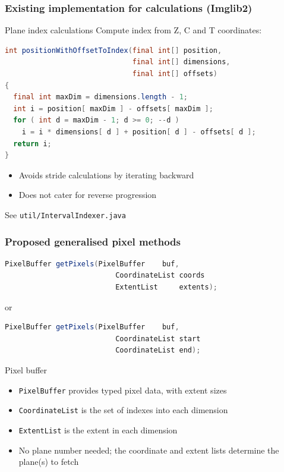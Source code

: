 \documentclass{beamer}
\newcommand{\filename}[1]{\texttt{#1}}
\newcommand{\class}[1]{\texttt{#1}}
\begin{document}
\begin{frame}[fragile]
  \frametitle{Existing implementation for calculations (Imglib2)}
  \begin{block}{Plane index calculations}
    Compute index from Z, C and T coordinates:
    \begin{lstlisting}[language=Java]
int positionWithOffsetToIndex(final int[] position,
                              final int[] dimensions,
                              final int[] offsets)
{
  final int maxDim = dimensions.length - 1;
  int i = position[ maxDim ] - offsets[ maxDim ];
  for ( int d = maxDim - 1; d >= 0; --d )
    i = i * dimensions[ d ] + position[ d ] - offsets[ d ];
  return i;
}
    \end{lstlisting}
    \begin{itemize}
    \item Avoids stride calculations by iterating backward
    \item Does not cater for reverse progression
    \end{itemize}
  See \filename{util/IntervalIndexer.java}
  \end{block}
\end{frame}

\begin{frame}[fragile]
  \frametitle{Proposed generalised pixel methods}
  \begin{lstlisting}[language=Java]
    PixelBuffer getPixels(PixelBuffer    buf,
                          CoordinateList coords
                          ExtentList     extents);
  \end{lstlisting}
  or
  \begin{lstlisting}[language=Java]
    PixelBuffer getPixels(PixelBuffer    buf,
                          CoordinateList start
                          CoordinateList end);
  \end{lstlisting}
  \begin{block}{Pixel buffer}
    \begin{itemize}
    \item \class{PixelBuffer} provides typed pixel data, with extent sizes
    \item \class{CoordinateList} is the set of indexes into each dimension
    \item \class{ExtentList} is the extent in each dimension
    \item No plane number needed; the coordinate and extent lists
      determine the plane(s) to fetch
    \end{itemize}
  \end{block}
\end{frame}
\end{document}
